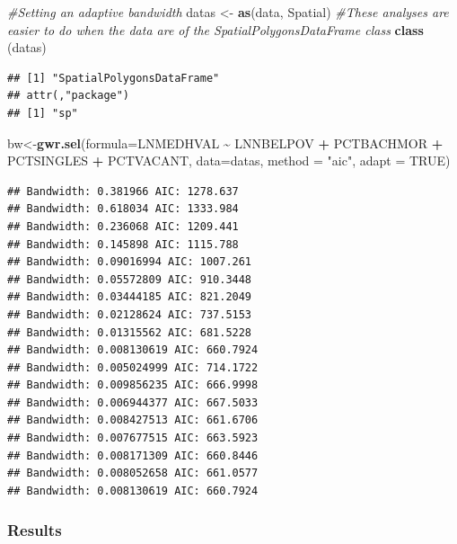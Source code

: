 \documentclass[
]{article}
\newenvironment{Shaded}{\begin{snugshade}}{\end{snugshade}}
\newcommand{\AttributeTok}[1]{\textcolor[rgb]{0.13,0.29,0.53}{#1}}
\newcommand{\CommentTok}[1]{\textcolor[rgb]{0.56,0.35,0.01}{\textit{#1}}}
\newcommand{\ConstantTok}[1]{\textcolor[rgb]{0.56,0.35,0.01}{#1}}
\newcommand{\FunctionTok}[1]{\textcolor[rgb]{0.13,0.29,0.53}{\textbf{#1}}}
\newcommand{\NormalTok}[1]{#1}
\newcommand{\OtherTok}[1]{\textcolor[rgb]{0.56,0.35,0.01}{#1}}
\newcommand{\SpecialCharTok}[1]{\textcolor[rgb]{0.81,0.36,0.00}{\textbf{#1}}}
\newcommand{\StringTok}[1]{\textcolor[rgb]{0.31,0.60,0.02}{#1}}
\begin{document}
\begin{Shaded}
\begin{Highlighting}[]
\CommentTok{\#Setting an adaptive bandwidth}
\NormalTok{datas }\OtherTok{\textless{}{-}} \FunctionTok{as}\NormalTok{(data, }\StringTok{\textquotesingle{}Spatial\textquotesingle{}}\NormalTok{)  }\CommentTok{\#These analyses are easier to do when the data are of the SpatialPolygonsDataFrame class}
\FunctionTok{class}\NormalTok{ (datas)}
\end{Highlighting}
\end{Shaded}

\begin{verbatim}
## [1] "SpatialPolygonsDataFrame"
## attr(,"package")
## [1] "sp"
\end{verbatim}

\begin{Shaded}
\begin{Highlighting}[]
\NormalTok{bw}\OtherTok{\textless{}{-}}\FunctionTok{gwr.sel}\NormalTok{(}\AttributeTok{formula=}\NormalTok{LNMEDHVAL }\SpecialCharTok{\textasciitilde{}}\NormalTok{ LNNBELPOV }\SpecialCharTok{+}\NormalTok{ PCTBACHMOR }\SpecialCharTok{+}\NormalTok{ PCTSINGLES }\SpecialCharTok{+}\NormalTok{ PCTVACANT,}
            \AttributeTok{data=}\NormalTok{datas,}
            \AttributeTok{method =} \StringTok{"aic"}\NormalTok{,}
            \AttributeTok{adapt =} \ConstantTok{TRUE}\NormalTok{)}
\end{Highlighting}
\end{Shaded}

\begin{verbatim}
## Bandwidth: 0.381966 AIC: 1278.637 
## Bandwidth: 0.618034 AIC: 1333.984 
## Bandwidth: 0.236068 AIC: 1209.441 
## Bandwidth: 0.145898 AIC: 1115.788 
## Bandwidth: 0.09016994 AIC: 1007.261 
## Bandwidth: 0.05572809 AIC: 910.3448 
## Bandwidth: 0.03444185 AIC: 821.2049 
## Bandwidth: 0.02128624 AIC: 737.5153 
## Bandwidth: 0.01315562 AIC: 681.5228 
## Bandwidth: 0.008130619 AIC: 660.7924 
## Bandwidth: 0.005024999 AIC: 714.1722 
## Bandwidth: 0.009856235 AIC: 666.9998 
## Bandwidth: 0.006944377 AIC: 667.5033 
## Bandwidth: 0.008427513 AIC: 661.6706 
## Bandwidth: 0.007677515 AIC: 663.5923 
## Bandwidth: 0.008171309 AIC: 660.8446 
## Bandwidth: 0.008052658 AIC: 661.0577 
## Bandwidth: 0.008130619 AIC: 660.7924
\end{verbatim}

\hypertarget{results-1}{%
\subsubsection{Results}\label{results-1}}
\end{document}

